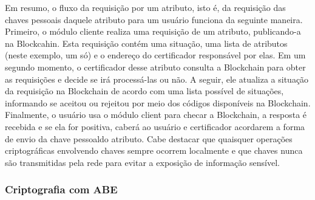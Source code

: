 \documentclass[a4paper,11pt]{article}
\begin{document}


Em resumo, o fluxo da requisição por um atributo, isto é, da requisição das chaves pessoais daquele atributo para um usuário funciona da seguinte maneira.
Primeiro, o módulo cliente realiza uma requisição de um atributo, publicando-a na Blockcahin.
Esta requisição contém uma situação, uma lista de atributos (neste exemplo, um só) e o endereço do certificador responsável por elas.
Em um segundo momento, o certificador desse atributo consulta a Blockchain para obter as requisições e decide se irá processá-las ou não.
A seguir, ele atualiza a situação da requisição na Blockchain de acordo com uma lista possível de situações, informando se aceitou ou rejeitou por meio dos códigos disponíveis na Blockchain.
Finalmente, o usuário usa o módulo client para checar a Blockchain, a resposta é recebida e se ela for positiva, caberá ao usuário e certificador acordarem a forma de envio da chave pessoaldo atributo.
Cabe destacar que quaisquer operações criptográficas envolvendo chaves sempre ocorrem localmente e que chaves nunca são transmitidas pela rede para evitar a exposição de informação sensível.

\subsubsection{Criptografia com ABE}
\label{sec:sub:criptografia-abe}
\end{document}
